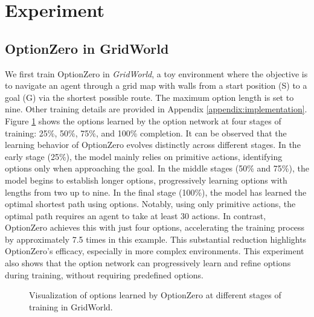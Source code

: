 \section{Experiment}

\subsection{OptionZero in GridWorld}
\label{sec:optionzero_gridworld}
We first train OptionZero in \textit{GridWorld}, a toy environment where the objective is to navigate an agent through a grid map with walls from a start position (S) to a goal (G) via the shortest possible route.
The maximum option length is set to nine.
Other training details are provided in Appendix \ref {appendix:implementation}.
Figure \ref{fig:maze} shows the options learned by the option network at four stages of training: 25\%, 50\%, 75\%, and 100\% completion.
It can be observed that the learning behavior of OptionZero evolves distinctly across different stages.
In the early stage (25\%), the model mainly relies on primitive actions, identifying options only when approaching the goal.
In the middle stages (50\% and 75\%), the model begins to establish longer options, progressively learning options with lengths from two up to nine.
In the final stage (100\%), the model has learned the optimal shortest path using options.
Notably, using only primitive actions, the optimal path requires an agent to take at least 30 actions.
In contrast, OptionZero achieves this with just four options, accelerating the training process by approximately 7.5 times in this example.
This substantial reduction highlights OptionZero's efficacy, especially in more complex environments.
This experiment also shows that the option network can progressively learn and refine options during training, without requiring predefined options.

\begin{figure}[h!t]
\centering
{}
    \label{fig:maze_25}
    \label{fig:maze_50}
    \label{fig:maze_75}
    \label{fig:maze_100}
\caption{Visualization of options learned by OptionZero at different stages of training in GridWorld.}
\label{fig:maze}
\end{figure}



